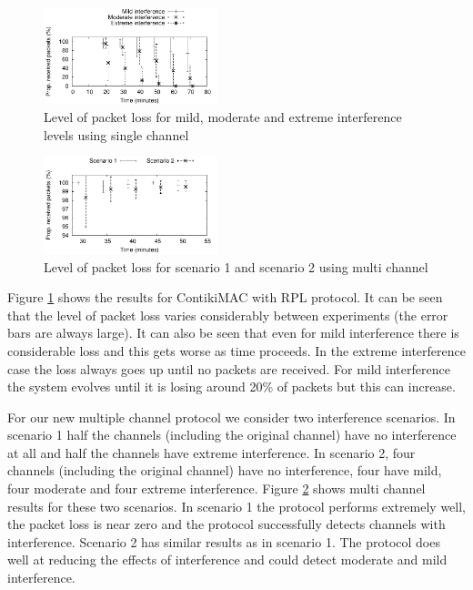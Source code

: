 \begin{figure}
\centering
\includegraphics[width=0.45\textwidth]{single_channel.pdf}
\caption{Level of packet loss for mild, moderate and extreme interference levels using single channel}
\label{fig:interference}
\end{figure}

\begin{figure}
\centering
\includegraphics[width=0.45\textwidth]{multi_channel.pdf}
\caption{Level of packet loss for scenario 1 and scenario 2 using multi channel}
\label{fig:multi_interference}
\end{figure}

Figure \ref{fig:interference} shows the results for ContikiMAC with RPL protocol. It can be seen that the level of packet loss varies considerably between experiments (the error bars are always large). It can also be seen that even for mild interference there is considerable loss and this gets worse as time proceeds. In the extreme interference case the loss always goes up until no packets are received. For mild interference the system evolves until it is losing around 20\% of packets but this can increase.

For our new multiple channel protocol we consider two interference scenarios.
In scenario 1 half the channels (including the original channel) have no
interference at all and half the channels have extreme interference.
In scenario 2, four channels (including the original channel) have no
interference, four have mild, four moderate and four extreme interference.
Figure \ref{fig:multi_interference} shows multi channel results for these
two scenarios.  In scenario 1 the protocol performs extremely well, the packet loss is near zero and the protocol successfully detects channels with interference.
Scenario 2 has similar results as in scenario 1. The protocol does well at reducing the effects of interference and could detect moderate and mild interference.

